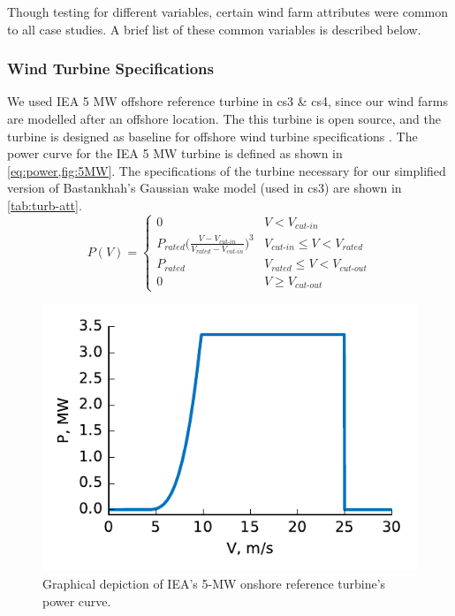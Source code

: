 Though testing for different variables, certain wind farm attributes were common to all case studies.
A brief list of these common variables is described below.

\subsubsection{Wind Turbine Specifications} \label{sec:turb}
	We used IEA 5 MW offshore reference turbine in cs3 \& cs4, since our wind farms are modelled after an offshore location.
	The this turbine is open source, and the turbine is designed as baseline for offshore wind turbine specifications \cite{NREL5MW}.
	The power curve for the IEA 5 MW turbine is defined as shown in \cref{eq:power,fig:5MW}.
	The specifications of the turbine necessary for our simplified version of Bastankhah's Gaussian wake model (used in cs3) are shown in \cref{tab:turb-att}.  %
	\begin{equation}\label{eq:power}
		P(V) = 
		\begin{cases} 
			0 & V < V_{\textit{cut-in}} \\
			P_{\textit{rated}}\bigg(\frac{V-V_{\textit{cut-in}}}{V_{\textit{rated}}-V_{\textit{cut-in}}}\bigg)^3 & V_{\textit{cut-in}}\leq V < V_{\textit{rated}} \\
			P_{\textit{rated}} & V_{\textit{rated}} \leq V < V_{\textit{cut-out}} \\
			0 & V \geq V_{\textit{cut-out}}
		\end{cases}
	\end{equation}
	\begin{figure}[H]
	    \centering
	   \includegraphics[]{./figures/power_curve.pdf}
	    \caption{Graphical depiction of IEA's 5-MW onshore reference turbine's power curve.}
	    \label{fig:5MW}
	\end{figure}
